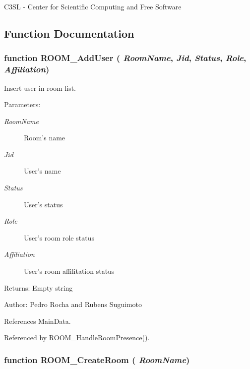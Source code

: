 C3SL - Center for Scientific Computing and Free Software 

\subsection{Function Documentation}
\subsubsection[ROOM\_\-AddUser]{\setlength{\rightskip}{0pt plus 5cm}function ROOM\_\-AddUser ( {\em RoomName}, \/   {\em Jid}, \/   {\em Status}, \/   {\em Role}, \/   {\em Affiliation})}\label{room_2room_8js_d458a1c31c7bc15a3e6d33fb2ec66bcb}


Insert user in room list. 

\begin{Desc}
\item[Parameters:]
\begin{description}
\item[{\em RoomName}]Room's name \item[{\em Jid}]User's name \item[{\em Status}]User's status \item[{\em Role}]User's room role status \item[{\em Affiliation}]User's room affilitation status \end{description}
\end{Desc}
\begin{Desc}
\item[Returns:]Empty string \end{Desc}
\begin{Desc}
\item[Author:]Pedro Rocha and Rubens Suguimoto \end{Desc}


References MainData.

Referenced by ROOM\_\-HandleRoomPresence().
\subsubsection[ROOM\_\-CreateRoom]{\setlength{\rightskip}{0pt plus 5cm}function ROOM\_\-CreateRoom ( {\em RoomName})}\label{room_2room_8js_f6fef7f6fb3a2e158577ab49889bb426}




